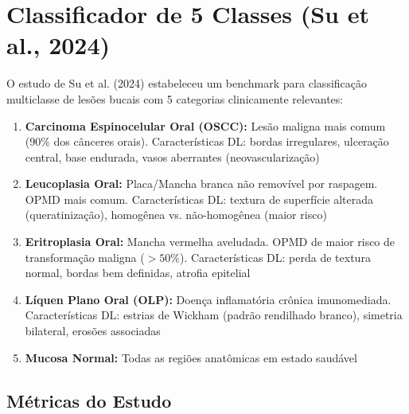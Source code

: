 
\section{Classificador de 5 Classes (Su et al., 2024)}
\label{sec:classificador-5}

O estudo de Su et al. (2024) estabeleceu um benchmark para classificação
multiclasse de lesões bucais com 5 categorias clinicamente relevantes:

\begin{enumerate}
  \item \textbf{Carcinoma Espinocelular Oral (OSCC):} Lesão maligna mais comum
        (90\% dos cânceres orais). Características DL: bordas irregulares,
        ulceração central, base endurada, vasos aberrantes (neovascularização)

  \item \textbf{Leucoplasia Oral:} Placa/Mancha branca não removível por raspagem.
        OPMD mais comum. Características DL: textura de superfície alterada
        (queratinização), homogênea vs. não-homogênea (maior risco)

  \item \textbf{Eritroplasia Oral:} Mancha vermelha aveludada. OPMD de maior
        risco de transformação maligna ($> 50\%$). Características DL: perda
        de textura normal, bordas bem definidas, atrofia epitelial

  \item \textbf{Líquen Plano Oral (OLP):} Doença inflamatória crônica
        imunomediada. Características DL: estrias de Wickham (padrão rendilhado
        branco), simetria bilateral, erosões associadas

  \item \textbf{Mucosa Normal:} Todas as regiões anatômicas em estado saudável
\end{enumerate}

\subsection{Métricas do Estudo}

